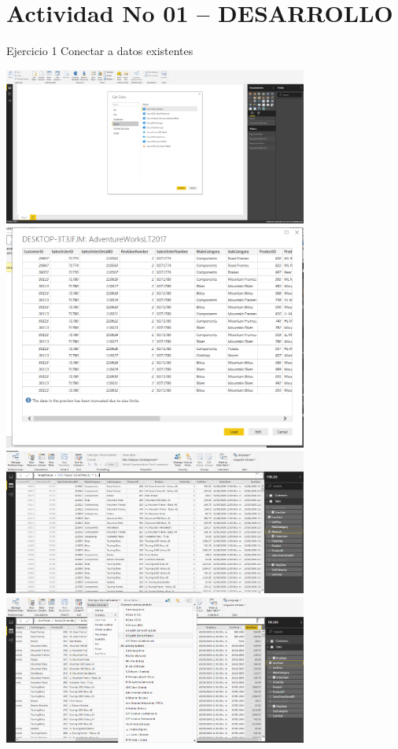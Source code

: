  \section{Actividad No 01 – DESARROLLO} 
Ejercicio 1  Conectar a datos existentes \\
	\begin{center}
	\includegraphics[width=10cm]{./Imagenes/11.png}\\

	\includegraphics[width=10cm]{./Imagenes/12.png}\\

	\includegraphics[width=10cm]{./Imagenes/13.png}\\

	\includegraphics[width=10cm]{./Imagenes/14.png}\\


\end{center}
